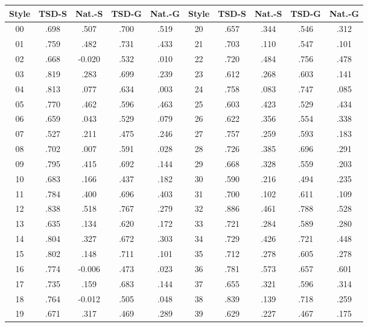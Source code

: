 \begin{tabular}{ccccc@{\hspace{9pt}}ccccc}
\toprule
Style & TSD-S & Nat.-S & TSD-G & Nat.-G & Style & TSD-S & Nat.-S & TSD-G & Nat.-G \\
\midrule
00 & .698 & .507 & .700 & .519 & 20 & .657 & .344 & .546 & .312 \\
01 & .759 & .482 & .731 & .433 & 21 & .703 & .110 & .547 & .101 \\
02 & .668 & -0.020 & .532 & .010 & 22 & .720 & .484 & .756 & .478 \\
03 & .819 & .283 & .699 & .239 & 23 & .612 & .268 & .603 & .141 \\
04 & .813 & .077 & .634 & .003 & 24 & .758 & .083 & .747 & .085 \\
05 & .770 & .462 & .596 & .463 & 25 & .603 & .423 & .529 & .434 \\
06 & .659 & .043 & .529 & .079 & 26 & .622 & .356 & .554 & .338 \\
07 & .527 & .211 & .475 & .246 & 27 & .757 & .259 & .593 & .183 \\
08 & .702 & .007 & .591 & .028 & 28 & .726 & .385 & .696 & .291 \\
09 & .795 & .415 & .692 & .144 & 29 & .668 & .328 & .559 & .203 \\
10 & .683 & .166 & .437 & .182 & 30 & .590 & .216 & .494 & .235 \\
11 & .784 & .400 & .696 & .403 & 31 & .700 & .102 & .611 & .109 \\
12 & .838 & .518 & .767 & .279 & 32 & .886 & .461 & .788 & .528 \\
13 & .635 & .134 & .620 & .172 & 33 & .721 & .284 & .589 & .280 \\
14 & .804 & .327 & .672 & .303 & 34 & .729 & .426 & .721 & .448 \\
15 & .802 & .148 & .711 & .101 & 35 & .712 & .278 & .605 & .278 \\
16 & .774 & -0.006 & .473 & .023 & 36 & .781 & .573 & .657 & .601 \\
17 & .735 & .159 & .683 & .144 & 37 & .655 & .321 & .596 & .314 \\
18 & .764 & -0.012 & .505 & .048 & 38 & .839 & .139 & .718 & .259 \\
19 & .671 & .317 & .469 & .289 & 39 & .629 & .227 & .467 & .175 \\
\bottomrule
\end{tabular}
